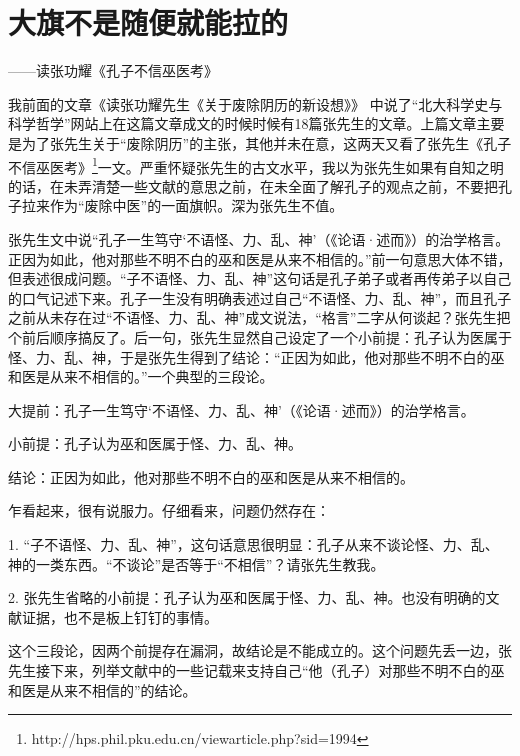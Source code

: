 \section{大旗不是随便就能拉的}
\centerline{
	\yuesong ——读张功耀《孔子不信巫医考》
}

\mbox{}

我前面的文章《读张功耀先生《关于废除阴历的新设想》》 中说了“北大科学史与科学哲学”网站上在这篇文章成文的时候时候有18篇张先生的文章。上篇文章主要是为了张先生关于“废除阴历”的主张，其他并未在意，这两天又看了张先生《孔子不信巫医考》\footnote{http://hps.phil.pku.edu.cn/viewarticle.php?sid=1994}一文。严重怀疑张先生的古文水平，我以为张先生如果有自知之明的话，在未弄清楚一些文献的意思之前，在未全面了解孔子的观点之前，不要把孔子拉来作为“废除中医”的一面旗帜。深为张先生不值。

张先生文中说“孔子一生笃守‘不语怪、力、乱、神’（《论语·述而》）的治学格言。正因为如此，他对那些不明不白的巫和医是从来不相信的。”前一句意思大体不错，但表述很成问题。“子不语怪、力、乱、神”这句话是孔子弟子或者再传弟子以自己的口气记述下来。孔子一生没有明确表述过自己“不语怪、力、乱、神”，而且孔子之前从未存在过“不语怪、力、乱、神”成文说法，“格言”二字从何谈起？张先生把个前后顺序搞反了。后一句，张先生显然自己设定了一个小前提：孔子认为医属于怪、力、乱、神，于是张先生得到了结论：“正因为如此，他对那些不明不白的巫和医是从来不相信的。”一个典型的三段论。

大提前：孔子一生笃守‘不语怪、力、乱、神’（《论语·述而》）的治学格言。

小前提：孔子认为巫和医属于怪、力、乱、神。

结论：正因为如此，他对那些不明不白的巫和医是从来不相信的。

乍看起来，很有说服力。仔细看来，问题仍然存在：

1.  “子不语怪、力、乱、神”，这句话意思很明显：孔子从来不谈论怪、力、乱、神的一类东西。“不谈论”是否等于“不相信”？请张先生教我。

2.  张先生省略的小前提：孔子认为巫和医属于怪、力、乱、神。也没有明确的文献证据，也不是板上钉钉的事情。

这个三段论，因两个前提存在漏洞，故结论是不能成立的。这个问题先丢一边，张先生接下来，列举文献中的一些记载来支持自己“他（孔子）对那些不明不白的巫和医是从来不相信的”的结论。

